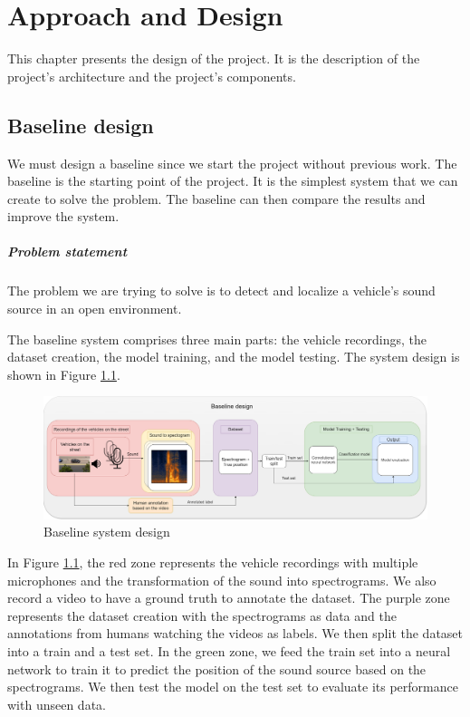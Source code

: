 
\chapter{Approach and Design}
\label{ch:methodology}

This chapter presents the design of the project. It is the description of the project's architecture and the project's components.

\section{Baseline design}
\label{sec:baseline_design}

We must design a baseline since we start the project without previous work. The baseline is the starting point of the project. It is the simplest system that we can create to solve the problem. The baseline can then compare the results and improve the system.

\paragraph{Problem statement}

The problem we are trying to solve is to detect and localize a vehicle's sound source in an open environment. 

The baseline system comprises three main parts: the vehicle recordings, the dataset creation, the model training, and the model testing. The system design is shown in Figure \ref{fig:baseline_system_design}.

\begin{figure}[H]
    \centering
    \includegraphics[width=1\textwidth]{../Images/baseline_system_design.drawio.png}
    \caption{Baseline system design}
    \label{fig:baseline_system_design}
\end{figure}

In Figure \ref{fig:baseline_system_design}, the red zone represents the vehicle recordings with multiple microphones and the transformation of the sound into spectrograms. We also record a video to have a ground truth to annotate the dataset. The purple zone represents the dataset creation with the spectrograms as data and the annotations from humans watching the videos as labels. We then split the dataset into a train and a test set. In the green zone, we feed the train set into a neural network to train it to predict the position of the sound source based on the spectrograms. We then test the model on the test set to evaluate its performance with unseen data.

